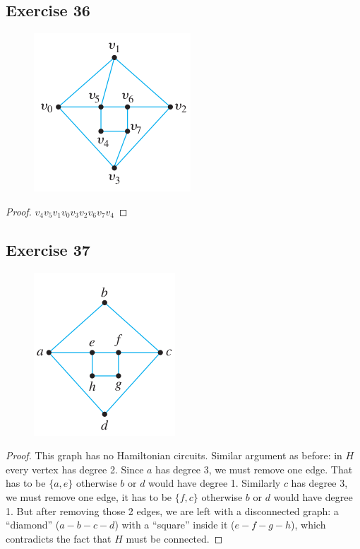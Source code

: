 \documentclass[14pt]{extarticle}
\begin{document}
\subsection{Exercise 36}
\begin{figure}[ht!]
    \centering
    \includegraphics[scale=0.6]{../images/10.1.36.png}
\end{figure}

\begin{proof}
    \(v_4v_5v_1v_0v_3v_2v_6v_7v_4\)
\end{proof}

\subsection{Exercise 37}
\begin{figure}[ht!]
    \centering
    \includegraphics[scale=0.7]{../images/10.1.37.png}
\end{figure}

\begin{proof}
    This graph has no Hamiltonian circuits. Similar argument as before: in \(H\) every vertex has degree 2. Since \(a\) has
    degree 3, we must remove one edge. That has to be \(\{a,e\}\) otherwise \(b\) or \(d\) would have degree 1. Similarly \(c\)
    has degree 3, we must remove one edge, it has to be \(\{f,c\}\) otherwise \(b\) or \(d\) would have degree 1. But after
    removing those 2 edges, we are left with a disconnected graph: a ``diamond'' (\(a-b-c-d\)) with a ``square'' inside it
    (\(e-f-g-h\)), which contradicts the fact that \(H\) must be connected.
\end{proof}
\end{document}
